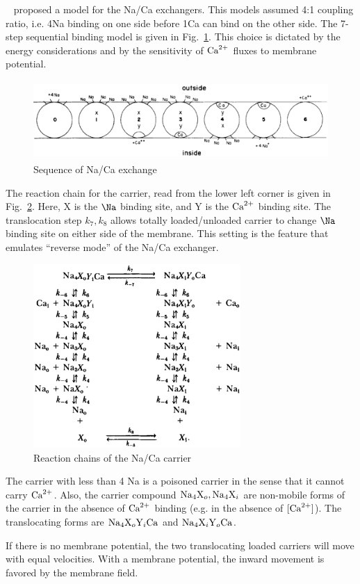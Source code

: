 ~\citep{mullins1977mnc} proposed a model for the Na/Ca exchangers.
This models assumed 4:1 coupling ratio, i.e. 4Na binding on one side before 1Ca
can bind on the other side. The 7-step sequential binding model is given in
Fig.~\ref{fig:Mullins_NaCa}. This choice is dictated by the energy
considerations and by the sensitivity of ${\text{Ca}^{2+}}$ fluxes to membrane potential.

\begin{figure}[hbt]
  \centerline{\includegraphics[height=3cm,
    angle=0]{./images/Mullins_NaCa.eps}}
\caption{Sequence of Na/Ca exchange}
\label{fig:Mullins_NaCa}
\end{figure}

The reaction chain for the carrier, read from the lower left corner is
given in Fig.~\ref{fig:Mullins_kinetics}.  Here, X is the $\Na$
binding site, and Y is the ${\text{Ca}^{2+}}$ binding site.  The translocation step
$k_7,k_8$ allows totally loaded/unloaded carrier to change $\Na$
binding site on either side of the membrane. This setting is the
feature that emulates ``reverse mode'' of the Na/Ca exchanger. 
\begin{figure}[hbt]
  \centerline{\includegraphics[height=7cm,
    angle=0]{./images/Mullins_kinetics.eps}}
  \caption{Reaction chains of the Na/Ca carrier}
\label{fig:Mullins_kinetics}
\end{figure}

\begin{framed}
  The carrier with less than 4 Na is a poisoned carrier in the sense
  that it cannot carry ${\text{Ca}^{2+}}$. Also, the carrier compound $\ce{Na4X_o},
  \ce{Na4X_i}$ are non-mobile forms of the carrier in the absence of
  ${\text{Ca}^{2+}}$ binding (e.g. in the absence of $[{\text{Ca}^{2+}}]$). The translocating
  forms are $\ce{Na4X_oY_iCa}$ and $\ce{Na4X_iY_oCa}$.
  
  If there is no membrane potential, the two translocating loaded
  carriers will move with equal velocities. With a membrane potential,
  the inward movement is favored by the membrane field.

\end{framed}

